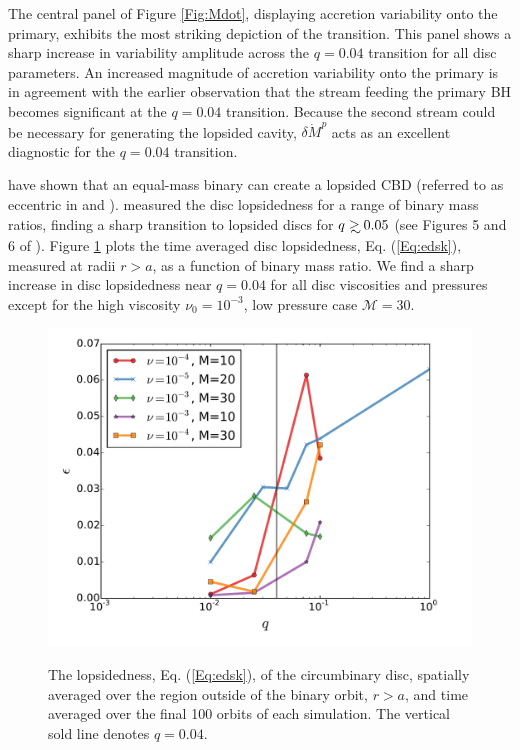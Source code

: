 \documentclass[usenatbib]{mnras}
\newcommand\gsim{\mathrel{\rlap{\lower4pt\hbox{\hskip1pt$\sim$}}
        \raise1pt\hbox{$>$}}}
\def\Mach{\mathcal{M}}
\begin{document}
The central panel of Figure \ref{Fig:Mdot}, displaying accretion
variability onto the primary, exhibits the most striking depiction of
the transition. This panel shows a sharp increase in variability
amplitude across the $q=0.04$ transition for all disc parameters. An
increased magnitude of accretion variability onto the primary is in
agreement with the earlier observation that the stream feeding the
primary BH becomes significant at the $q=0.04$ transition. Because the
second stream could be necessary for generating the lopsided cavity,
$\delta \dot{M}^p$ acts as an excellent diagnostic for the $q=0.04$
transition.




\cite{MacFadyen:2008, ShiKrolik:2012:ApJ, Noble+2012, DHM:2013:MNRAS,
  Farris:2014,Farris:2015:Cool,Farris:2015:GW, ShiKrolik:2015} have
shown that an equal-mass binary can create a lopsided CBD (referred to
as eccentric in \cite{MacFadyen:2008} and
\cite{Farris:2014}). \cite{Farris:2014} measured the disc lopsidedness
for a range of binary mass ratios, finding a sharp transition to
lopsided discs for $q\gsim0.05$ (see Figures 5 and 6 of
\citealt{Farris:2014}). Figure \ref{Fig:edsk} plots the time averaged
disc lopsidedness, Eq. (\ref{Eq:edsk}), measured at radii $r>a$, as a
function of binary mass ratio. We find a sharp increase in disc
lopsidedness near $q=0.04$ for all disc viscosities and pressures
except for the high viscosity $\nu_0=10^{-3}$, low pressure case
$\Mach=30$.


\begin{figure}
\begin{center}
\includegraphics[scale=0.4]{edsk1_100.pdf} \\
\end{center}
\caption{The lopsidedness, Eq. (\ref{Eq:edsk}), of the circumbinary
  disc, spatially averaged over the region outside of the binary
  orbit, $r>a$, and time averaged over the final 100 orbits of each
  simulation. The vertical sold line denotes $q=0.04$.}
\label{Fig:edsk}
\end{figure}
\end{document}
